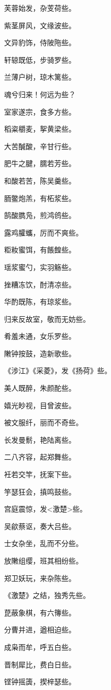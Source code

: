 \documentclass[12pt,a4paper]{ctexbook}
\begin{document}
芙蓉始发，杂芰荷些。\par
紫茎屏风，文缘波些。\par
文异豹饰，侍陂陁些。\par
轩辌既低，步骑罗些。\par
兰薄户树，琼木篱些。\par
魂兮归来！何远为些？\par
室家遂宗，食多方些。\par
稻粢穱麦，挐黄梁些。\par
大苦醎酸，辛甘行些。\par
肥牛之腱，臑若芳些。\par
和酸若苦，陈吴羹些。\par
胹鳖炮羔，有柘浆些。\par
鹄酸臇凫，煎鸿鸧些。\par
露鸡臛蠵，厉而不爽些。\par
粔籹蜜饵，有餦餭些。\par
瑶浆蜜勺，实羽觞些。\par
挫糟冻饮，酎清凉些。\par
华酌既陈，有琼浆些。\par
归来反故室，敬而无妨些。\par
肴羞未通，女乐罗些。\par
敶钟按鼓，造新歌些。\par
《涉江》《采菱》，发《扬荷》些。\par
美人既醉，朱颜酡些。\par
嬉光眇视，目曾波些。\par
被文服纤，丽而不奇些。\par
长发曼鬋，艳陆离些。\par
二八齐容，起郑舞些。\par
衽若交竿，抚案下些。\par
竽瑟狂会，搷鸣鼓些。\par
宫庭震惊，发<激楚>些。\par
吴歈蔡讴，奏大吕些。\par
士女杂坐，乱而不分些。\par
放敶组缨，班其相纷些。\par
郑卫妖玩，来杂陈些。\par
《激楚》之结，独秀先些。\par
菎蔽象棋，有六簙些。\par
分曹并进，遒相迫些。\par
成枭而牟，呼五白些。\par
晋制犀比，费白日些。\par
铿钟摇簴，揳梓瑟些。\par
\end{document}
